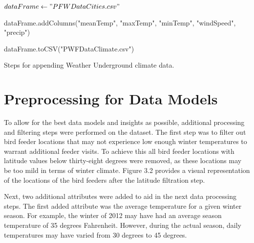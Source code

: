 \begin{algorithm}[H]
\DontPrintSemicolon
{}
 
$dataFrame\leftarrow "PFWDataCities.csv"$    \;

dataFrame.addColumns("meanTemp", "maxTemp", "minTemp", "windSpeed", "precip")
 

\Return dataFrame.toCSV("PWFDataClimate.csv")
 
\caption{Steps for appending Weather Underground climate data.}
\end{algorithm}

\section{Preprocessing for Data Models}

To allow for the best data models and insights as possible, additional processing and filtering steps were performed on the dataset. The first step was to filter out bird feeder locations that may not experience low enough winter temperatures to warrant additional feeder visits. To achieve this all bird feeder locations with latitude values below thirty-eight degrees were removed, as these locations may be too mild in terms of winter climate. Figure 3.2 provides a visual representation of the locations of the bird feeders after the latitude filtration step. 

Next, two additional attributes were added to aid in the next data processing steps. The first added attribute was the average temperature for a given winter season. For example, the winter of 2012 may have had an average season temperature of 35 degrees Fahrenheit. However, during the actual season, daily temperatures may have varied from 30 degrees to 45 degrees. 

